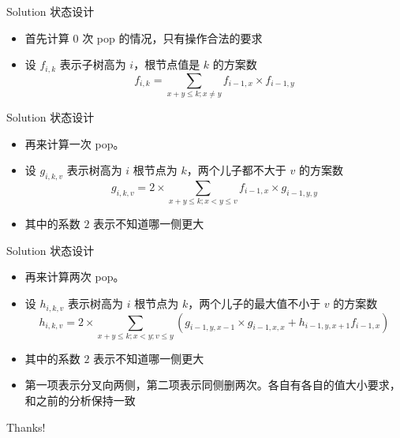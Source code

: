 ﻿\documentclass[aspectratio=169]{ctexbeamer}
\begin{document}
\begin{frame}{Solution}
    状态设计
    \begin{itemize}
        \item 首先计算 $ 0 $ 次 pop 的情况，只有操作合法的要求
        \item 设 $f_{i,k}$ 表示子树高为 $i$，根节点值是 $k$ 的方案数
        $$
            f_{i,k}=\sum_{x+y\le k;x\neq y}f_{i-1,x}\times f_{i-1,y}
        $$
    \end{itemize}
\end{frame}

\begin{frame}{Solution}
    状态设计
    \begin{itemize}
        \item 再来计算一次 pop。
        \item 设 $g_{i,k,v}$ 表示树高为 $i$ 根节点为 $k$，两个儿子都不大于 $v$ 的方案数
        $$
            g_{i,k,v}=2\times \sum_{x+y\le k;x<y\le v}f_{i-1,x}\times g_{i-1,y,y}
        $$
        \item 其中的系数 $2$ 表示不知道哪一侧更大
    \end{itemize}
\end{frame}

\begin{frame}{Solution}
    状态设计
    \begin{itemize}
        \item 再来计算两次 pop。
        \item 设 $h_{i,k,v}$ 表示树高为 $i$ 根节点为 $k$，两个儿子的最大值不小于 $v$ 的方案数
        $$
            h_{i,k,v}=2\times \sum_{x+y\le k;x<y;v\le y}\left(  g_{i-1,y,x-1}\times g_{i-1,x,x}  + h_{i-1,y,x+1}f_{i-1,x}  \right)
        $$
        \item 其中的系数 $2$ 表示不知道哪一侧更大
        \item 第一项表示分叉向两侧，第二项表示同侧删两次。各自有各自的值大小要求，和之前的分析保持一致
    \end{itemize}
\end{frame}



\begin{frame}
    \begin{center}
        {\Huge\calligra Thanks!}
    \end{center}
\end{frame}
\end{document}
